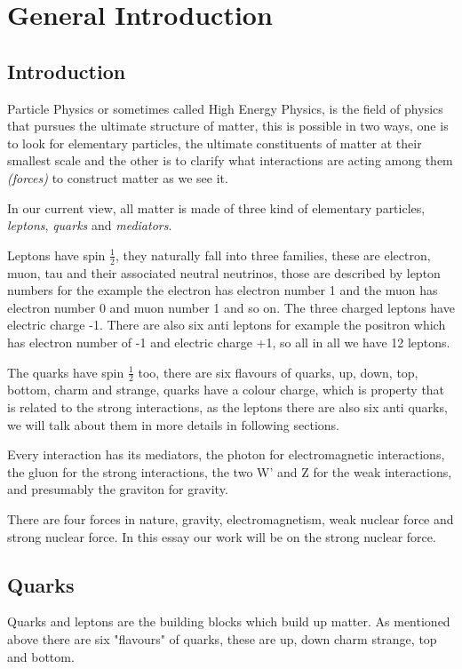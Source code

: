 \chapter{General Introduction}
\section{Introduction}
Particle Physics or sometimes called High Energy Physics, is the field of physics that pursues the ultimate structure of matter, this is possible in two ways, one is to look for elementary particles, the ultimate constituents of matter at their smallest scale and the other is to clarify what interactions are acting among them
 \emph{(forces)} to construct matter as we see it.

In our current view, all matter is made of three kind of elementary particles, \emph{leptons}, \emph{quarks} and \emph{mediators}.

Leptons have spin $\frac{1}{2}$, they naturally fall into three families, these are electron, muon, tau and their associated neutral neutrinos, those are described by lepton numbers for the example the electron has electron number 1 and the muon has electron number 0 and muon number 1 and so on. The three charged leptons have electric  charge -1. There are also six anti leptons for example the positron which has electron number of -1 and electric charge +1, so all in all we have 12 leptons.

The quarks have spin $\frac{1}{2}$ too, there are six flavours of quarks, up, down, top, bottom, charm and strange, quarks have a colour charge, which is property that is related to the strong interactions,  as the leptons there are also six anti quarks, we will talk about them in more details in following sections. 

Every interaction has its mediators, the photon for electromagnetic interactions, the gluon for the strong interactions, the two W' and Z for the weak interactions, and presumably the graviton for gravity.            

 
There are four forces in nature, gravity, electromagnetism, weak nuclear force and strong nuclear force. In this essay our work will be on the strong nuclear force. 

\section{Quarks}
Quarks and leptons are the building blocks which build up matter. As mentioned above there are six "flavours" of quarks, these are up, down charm strange, top and bottom.

